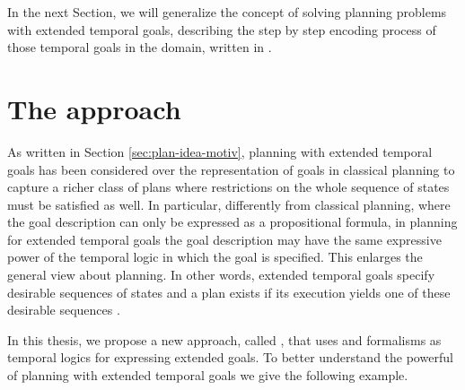 In the next Section, we will generalize the concept of solving \FOND planning problems with extended temporal goals, describing the step by step encoding process of those temporal goals in the \FOND domain, written in \PDDL.
\section{The \FONDFOR approach}\label{sec:fond-plan-appr}
As written in Section \ref{sec:plan-idea-motiv}, planning with extended temporal goals has been considered over the representation of goals in classical planning to capture a richer class of plans where restrictions on the whole sequence of states must be satisfied as well. In particular, differently from classical planning, where the goal description can only be expressed as a propositional formula, in planning for extended temporal goals the goal description may have the same expressive power of the temporal logic in which the goal is specified. This enlarges the general view about planning. In other words, extended temporal goals specify desirable sequences of states and a plan exists if its execution yields one of these desirable sequences \citep{bacchus1998planning}.

In this thesis, we propose a new approach, called \FONDFOR, that uses \LTLf and \PLTL formalisms as temporal logics for expressing extended goals.
To better understand the powerful of planning with extended temporal goals we give the following example.

